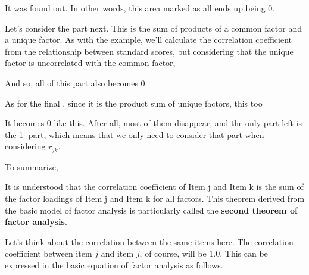 \documentclass{ltjsbook}
\begin{document}

It was found out. In other words, this area marked as  all ends up being $0$.


Let's consider the part  next. This is the sum of products of a common factor and a unique factor. As with the example, we'll calculate the correlation coefficient from the relationship between standard scores, but considering that the unique factor is uncorrelated with the common factor,

And so, all of this part also becomes $0$.

As for the final , since it is the product sum of unique factors, this too

It becomes $0$ like this. After all, most of them disappear, and the only part left is the \textcircled{1} part, which means that we only need to consider that part when considering $r_{jk}$.

To summarize,

It is understood that the correlation coefficient of Item j and Item k is the sum of the factor loadings of Item j and Item k for all factors. This theorem derived from the basic model of factor analysis is particularly called the \textbf{second theorem of factor analysis}.

Let's think about the correlation between the same items here. The correlation coefficient between item $j$ and item $j$, of course, will be $1.0$. This can be expressed in the basic equation of factor analysis as follows.

\end{document}

